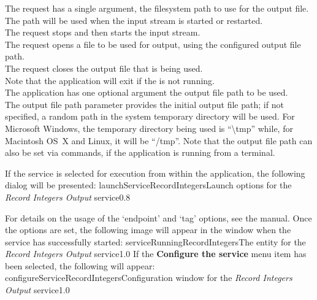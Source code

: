 The  request has a single argument,
the file\longDash{}system path to use for the output file.
The path will be used when the input stream is started or restarted.\\

The  request stops and then
starts the input stream.\\

The  request opens a file to be
used for output, using the configured output file path.\\

The  request closes the output
file that is being used.\\

Note that the application will exit if the  is not
running.\\

The application has one optional argument \longDash{} the output file path to be used.
\insertAppParameters
{}
\insertOutputServiceComment\\

The output file path parameter provides the initial output file path; if not specified, a
random path in the system temporary directory will be used.
For Microsoft Windows, the temporary directory being used is ``\textbackslash{}tmp''
while, for Macintosh OS~X and Linux, it will be ``/tmp''.
Note that the output file path can also be set via commands, if the application is
running from a terminal.\\

\insertStandardServiceCommands

If the service is selected for execution from within the \emph{\MMMU} application, the
following dialog will be presented:
%
{launchServiceRecordIntegers}{Launch options for the \emph{Record Integers Output}
service}{0.8}

For details on the usage of the `endpoint' and `tag' options, see the \emph{\MMMU} manual.
Once the options are set, the following image will appear in the \emph{\MMMU} window when
the service has successfully started:
%
{serviceRunningRecordIntegers}{The \emph{\MMMU} entity for the \emph{Record Integers
Output} service}{1.0}
\condPage{}
If the \textbf{Configure the service} menu item has been selected, the following will
appear:
%
{configureServiceRecordIntegers}{Configuration window for the \emph{Record Integers
Output} service}{1.0}

